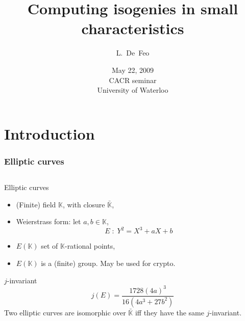 \documentclass[10pt]{beamer}
\title[Isogenies for the Cryptology]{Computing isogenies in small characteristics}
\author[L.~De~Feo]{L.~De~Feo}
\institute[École Polytechnique]{École Polytechnique, Paris, France}
\date[U of Waterloo, May 22, 2009]{May 22, 2009\\CACR seminar\\University of Waterloo}
\newcommand{\clot}[1]{\bar{#1}}  %
\newcommand{\K}{\mathbb{K}}  %
\newcommand{\0}{\mathcal{O}}  %
\begin{document}
\begin{frame}
  \titlepage
\end{frame}


\section{Introduction}

\begin{frame}
  \frametitle{Elliptic curves}

  \begin{columns} 
    \begin{column}{0.55\textwidth}
      \begin{block}{Elliptic curves}
        \begin{itemize}
        \item (Finite) field $\K$, with closure $\clot{\K}$,
        \item Weierstrass form: let $a,b\in\K$, 
          \[E \;:\; Y^2 = X^3 + aX + b\]
        \item $E(\K)$ set of $\K$-rational points,
        \item $E(\K)$ is a (finite) group. May be used for crypto.
        \end{itemize}
      \end{block}

      \begin{block}{$j$-invariant}
        \[j(E) = \frac{1728(4a)^3}{16(4a^3 + 27b^2)}\]
        Two elliptic curves are isomorphic over $\clot{\K}$ iff they
        have the same $j$-invariant.
      \end{block}
  
    \end{column}


\end{columns}
\end{frame}
\end{document}
